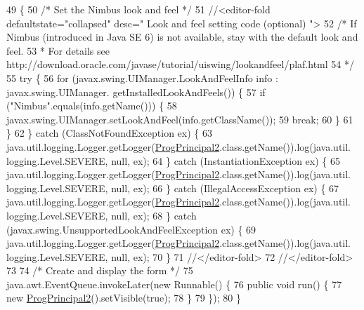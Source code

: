 \begin{DoxyCode}
49                                            \{
50         \textcolor{comment}{/* Set the Nimbus look and feel */}
51         \textcolor{comment}{//<editor-fold defaultstate="collapsed" desc=" Look and feel setting code (optional) ">}
52         \textcolor{comment}{/* If Nimbus (introduced in Java SE 6) is not available, stay with the default look and feel.}
53 \textcolor{comment}{         * For details see http://download.oracle.com/javase/tutorial/uiswing/lookandfeel/plaf.html }
54 \textcolor{comment}{         */}
55         \textcolor{keywordflow}{try} \{
56             \textcolor{keywordflow}{for} (javax.swing.UIManager.LookAndFeelInfo info : javax.swing.UIManager.
      getInstalledLookAndFeels()) \{
57                 \textcolor{keywordflow}{if} (\textcolor{stringliteral}{"Nimbus"}.equals(info.getName())) \{
58                     javax.swing.UIManager.setLookAndFeel(info.getClassName());
59                     \textcolor{keywordflow}{break};
60                 \}
61             \}
62         \} \textcolor{keywordflow}{catch} (ClassNotFoundException ex) \{
63             java.util.logging.Logger.getLogger(\mbox{\hyperlink{classpa__sesion6_1_1_prog_principal2_a1aed9d29f7195e51e8a0ab08f0165981}{ProgPrincipal2}}.class.getName()).log(java.util.
      logging.Level.SEVERE, null, ex);
64         \} \textcolor{keywordflow}{catch} (InstantiationException ex) \{
65             java.util.logging.Logger.getLogger(\mbox{\hyperlink{classpa__sesion6_1_1_prog_principal2_a1aed9d29f7195e51e8a0ab08f0165981}{ProgPrincipal2}}.class.getName()).log(java.util.
      logging.Level.SEVERE, null, ex);
66         \} \textcolor{keywordflow}{catch} (IllegalAccessException ex) \{
67             java.util.logging.Logger.getLogger(\mbox{\hyperlink{classpa__sesion6_1_1_prog_principal2_a1aed9d29f7195e51e8a0ab08f0165981}{ProgPrincipal2}}.class.getName()).log(java.util.
      logging.Level.SEVERE, null, ex);
68         \} \textcolor{keywordflow}{catch} (javax.swing.UnsupportedLookAndFeelException ex) \{
69             java.util.logging.Logger.getLogger(\mbox{\hyperlink{classpa__sesion6_1_1_prog_principal2_a1aed9d29f7195e51e8a0ab08f0165981}{ProgPrincipal2}}.class.getName()).log(java.util.
      logging.Level.SEVERE, null, ex);
70         \}
71         \textcolor{comment}{//</editor-fold>}
72         \textcolor{comment}{//</editor-fold>}
73 
74         \textcolor{comment}{/* Create and display the form */}
75         java.awt.EventQueue.invokeLater(\textcolor{keyword}{new} Runnable() \{
76             \textcolor{keyword}{public} \textcolor{keywordtype}{void} run() \{
77                 \textcolor{keyword}{new} \mbox{\hyperlink{classpa__sesion6_1_1_prog_principal2_a1aed9d29f7195e51e8a0ab08f0165981}{ProgPrincipal2}}().setVisible(\textcolor{keyword}{true});
78             \}
79         \});
80     \}
\end{DoxyCode}
